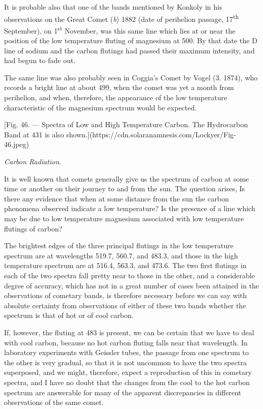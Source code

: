 \documentclass[a4paper, 12pt, oneside, polutonikogreek, english]{article}
\begin{document}
It is probable also that one of the bands mentioned by Konkoly in his observations on the Great Comet (\emph{b}) 1882 (date of perihelion passage, 17\textsuperscript{th} September), on 1\textsuperscript{st} November, was this same line which lies at or near the position of the low temperature fluting of magnesium at 500. By that date the D line of sodium and the carbon flutings had passed their maximum intensity, and had begun to fade out.

The same line was also probably seen in Coggia's Comet by Vogel (3. 1874), who records a bright line at about 499, when the comet was yet a month from perihelion, and when, therefore, the appearance of the low temperature characteristic of the magnesium spectrum would be expected.

[Fig. 46. --- Spectra of Low and High Temperature Carbon. The Hydrocarbon Band at 431 is also shown.](https://cdn.solaranamnesis.com/Lockyer/Fig-46.jpeg)

\emph{Carbon Radiation.}

It is well known that comets generally give us the spectrum of carbon at some time or another on their journey to and from the sun. The question arises, Is there any evidence that when at some distance from the sun the carbon phenomena observed indicate a low temperature? Is the presence of a line which may be due to low temperature magnesium associated with low temperature flutings of carbon?

The brightest edges of the three principal flutings in the low temperature spectrum are at wavelengths 519.7, 560.7, and 483.3, and those in the high temperature spectrum are at 516.4, 563.3, and 473.6. The two first flutings in each of the two spectra fall pretty near to those in the other, and a considerable degree of accuracy, which has not in a great number of cases been attained in the observations of cometary bands, is therefore necessary before we can say with absolute certainty from observations of either of these two bands whether the spectrum is that of hot or of cool carbon.

If, however, the fluting at 483 is present, we can be certain that we have to deal with cool carbon, because no hot carbon fluting falls near that wavelength. In laboratory experiments with Geissler tubes, the passage from one spectrum to the other is very gradual, so that it is not uncommon to have the two spectra superposed, and we might, therefore, expect a reproduction of this in cometary spectra, and I have no doubt that the changes from the cool to the hot carbon spectrum are answerable for many of the apparent discrepancies in different observations of the same comet.
\end{document}

